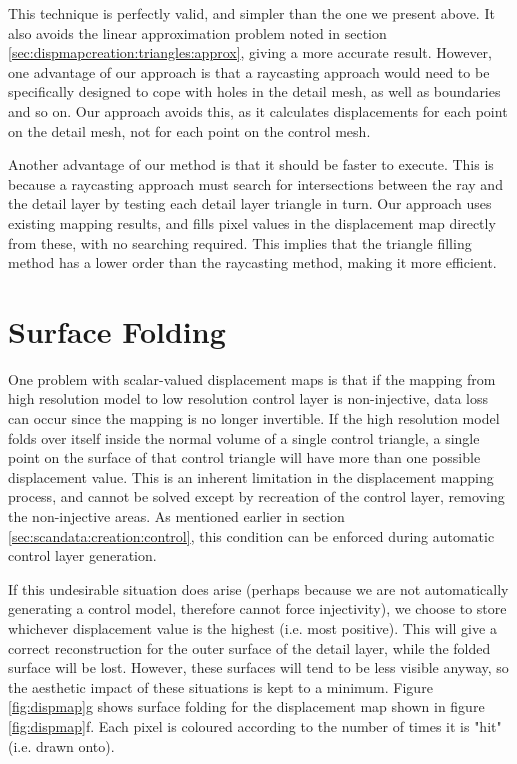 This technique is perfectly valid, and simpler than the one we present above. It also avoids the linear approximation problem noted in section \ref{sec:dispmapcreation:triangles:approx}, giving a more accurate result. However, one advantage of our approach is that a raycasting approach would need to be specifically designed to cope with holes in the detail mesh, as well as boundaries and so on. Our approach avoids this, as it calculates displacements for each point on the detail mesh, not for each point on the control mesh.

Another advantage of our method is that it should be faster to execute. This is because a raycasting approach must search for intersections between the ray and the detail layer by testing each detail layer triangle in turn. Our approach uses existing mapping results, and fills pixel values in the displacement map directly from these, with no searching required. This implies that the triangle filling method has a lower order than the raycasting method, making it more efficient.

\section{\label{sec:dispmapcreation:folding}Surface Folding}

One problem with scalar-valued displacement maps is that if the mapping from high resolution model to low resolution control layer is non-injective, data loss can occur since the mapping is no longer invertible. If the high resolution model folds over itself inside the normal volume of a single control triangle, a single point on the surface of that control triangle will have more than one possible displacement value. This is an inherent limitation in the displacement mapping process, and cannot be solved except by recreation of the control layer, removing the non-injective areas. As mentioned earlier in section \ref{sec:scandata:creation:control}, this condition can be enforced during automatic control layer generation.

If this undesirable situation does arise (perhaps because we are not automatically generating a control model, therefore cannot force injectivity), we choose to store whichever displacement value is the highest (i.e. most positive). This will give a correct reconstruction for the outer surface of the detail layer, while the folded surface will be lost. However, these surfaces will tend to be less visible anyway, so the aesthetic impact of these situations is kept to a minimum. Figure \ref{fig:dispmap}g shows surface folding for the displacement map shown in figure \ref{fig:dispmap}f. Each pixel is coloured according to the number of times it is "hit" (i.e. drawn onto).

